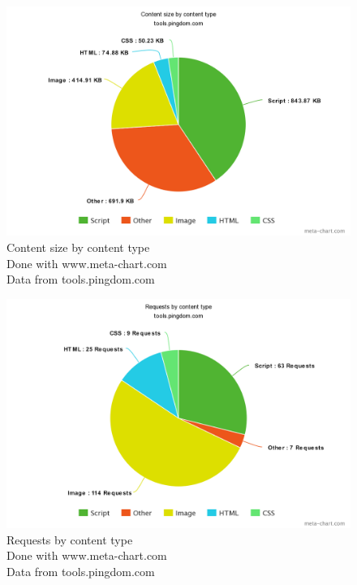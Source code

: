 \documentclass[conference]{IEEEtran}
\begin{document}
\begin{figure}
\caption{Content size by content type \\ 
Done with www.meta-chart.com \\ Data from tools.pingdom.com}
\includegraphics[width=\linewidth]{meta-chart.png}
\end{figure}


\begin{figure}
\caption{Requests by content type \\ 
Done with www.meta-chart.com \\ Data from tools.pingdom.com}
\includegraphics[width=\linewidth]{meta-chart1.png}
\end{figure}
\end{document}
